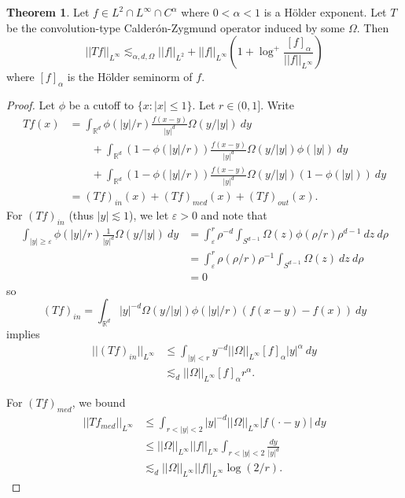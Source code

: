 \documentclass[12pt]{book}
\newcommand{\RR}{\mathbb{R}}
\theoremstyle{definition}
\newtheorem{theorem}{Theorem}[chapter]
\begin{document}
\begin{theorem}
Let $f \in L^2 \cap L^\infty \cap C^\alpha$ where $0 < \alpha < 1$ is a H\"older exponent.
Let $T$ be the convolution-type Calder\'on-Zygmund operator induced by some $\Omega$. Then
$$||Tf||_{L^\infty} \lesssim_{\alpha, d, \Omega} ||f||_{L^2} + ||f||_{L^\infty}(1 + \log^+ \frac{[f]_\alpha}{||f||_{L^\infty}})$$
where $[f]_\alpha$ is the H\"older seminorm of $f$.
\end{theorem}
\begin{proof}
Let $\phi$ be a cutoff to $\{x: |x| \leq 1\}$.
Let $r \in (0, 1]$.
Write
\begin{align*}Tf(x) &= \int_{\RR^d} \phi(|y|/r) \frac{f(x - y)}{|y|^d} \Omega(y/|y|) ~dy \\
&\qquad+ \int_{\RR^d} (1 - \phi(|y|/r))\frac{f(x - y)}{|y|^d} \Omega(y/|y|) \phi(|y|) ~dy\\
&\qquad + \int_{\RR^d}  (1 - \phi(|y|/r))\frac{f(x - y)}{|y|^d} \Omega(y/|y|) (1 - \phi(|y|)) ~dy
\\
&= (Tf)_{in}(x) + (Tf)_{med}(x) + (Tf)_{out}(x).
\end{align*}
For $(Tf)_{in}$ (thus $|y| \lesssim 1$), we let $\varepsilon > 0$ and note that
\begin{align*}\int_{|y| \geq \varepsilon} \phi(|y|/r) \frac{1}{|y|^d} \Omega(y/|y|) ~dy
&= \int_\varepsilon^r \rho^{-d} \int_{S^{d-1}} \Omega(z) \phi(\rho/r) \rho^{d - 1} ~dz ~d\rho\\
&= \int_\varepsilon^r \rho(\rho/r) \rho^{-1} \int_{S^{d-1}} \Omega(z) ~dz ~d\rho \\
&= 0
\end{align*}
so
$$(Tf)_{in} = \int_{\RR^d} |y|^{-d} \Omega(y/|y|) \phi(|y|/r)(f(x - y) - f(x)) ~dy$$
implies
\begin{align*}
||(Tf)_{in}||_{L^\infty} &\leq \int_{|y| < r} y^{-d} ||\Omega||_{L^\infty} [f]_\alpha |y|^\alpha ~dy\\
&\lesssim_d ||\Omega||_{L^\infty} [f]_\alpha r^\alpha.
\end{align*}

For $(Tf)_{med}$, we bound
\begin{align*}
||Tf_{med}||_{L^\infty} &\leq \int_{r < |y| < 2} |y|^{-d} ||\Omega||_{L^\infty} |f(\cdot - y)| ~dy \\
&\leq ||\Omega||_{L^\infty} ||f||_{L^\infty} \int_{r < |y| < 2} \frac{dy}{|y|^d} \\
&\lesssim_d ||\Omega||_{L^\infty} ||f||_{L^\infty} \log(2/r).
\end{align*}


\end{proof}
\end{document}
